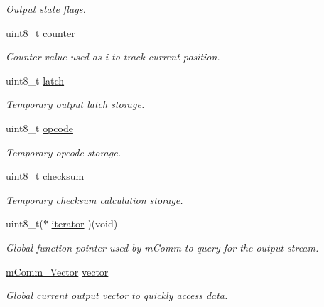 \begin{DoxyCompactItemize}
\begin{tabbing}
\end{tabbing}\begin{DoxyCompactList}\small\item\em Output state flags. \end{DoxyCompactList}\item 
uint8\+\_\+t \hyperlink{structm_comm___output_vector_a0480b812cba9c1d9c71a5fb1071bd0fc}{counter}
\begin{DoxyCompactList}\small\item\em Counter value used as \textquotesingle{}i\textquotesingle{} to track current position. \end{DoxyCompactList}\item 
uint8\+\_\+t \hyperlink{structm_comm___output_vector_a096d07a4c4a27a736c52abfd12d03345}{latch}
\begin{DoxyCompactList}\small\item\em Temporary output latch storage. \end{DoxyCompactList}\item 
uint8\+\_\+t \hyperlink{structm_comm___output_vector_a5c1b56e6bccc2a95dbddf1a08e56e87d}{opcode}
\begin{DoxyCompactList}\small\item\em Temporary opcode storage. \end{DoxyCompactList}\item 
uint8\+\_\+t \hyperlink{structm_comm___output_vector_a59eac9627282a484fbaf0aa7aa3b8a9a}{checksum}
\begin{DoxyCompactList}\small\item\em Temporary checksum calculation storage. \end{DoxyCompactList}\item 
uint8\+\_\+t($\ast$ \hyperlink{structm_comm___output_vector_a6995b26b309317115ab75caad4adcf1d}{iterator} )(void)
\begin{DoxyCompactList}\small\item\em Global function pointer used by m\+Comm to query for the output stream. \end{DoxyCompactList}\item 
\hyperlink{structm_comm___vector}{m\+Comm\+\_\+\+Vector} \hyperlink{structm_comm___output_vector_ab551eac4b88e8b284085f4355e2f26b6}{vector}
\begin{DoxyCompactList}\small\item\em Global current output vector to quickly access data. \end{DoxyCompactList}\end{DoxyCompactItemize}


